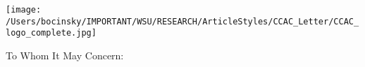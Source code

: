 \documentclass[letterpaper,11pt]{letter}
\begin{document}
\begin{letter}{}

\texttt{[image: /Users/bocinsky/IMPORTANT/WSU/RESEARCH/ArticleStyles/CCAC\_Letter/CCAC\_logo\_complete.jpg]}

\opening{To Whom It May Concern:}

%
%
%


\end{letter}
\end{document}
